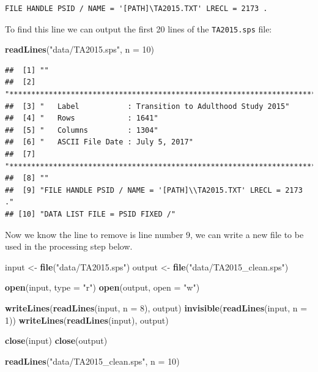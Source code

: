 \documentclass[]{book}
\newenvironment{Shaded}{\begin{snugshade}}{\end{snugshade}}
\newcommand{\KeywordTok}[1]{\textcolor[rgb]{0.13,0.29,0.53}{\textbf{{#1}}}}
\newcommand{\DataTypeTok}[1]{\textcolor[rgb]{0.13,0.29,0.53}{{#1}}}
\newcommand{\DecValTok}[1]{\textcolor[rgb]{0.00,0.00,0.81}{{#1}}}
\newcommand{\StringTok}[1]{\textcolor[rgb]{0.31,0.60,0.02}{{#1}}}
\newcommand{\NormalTok}[1]{{#1}}
\theoremstyle{definition}
\theoremstyle{definition}
\theoremstyle{remark}
\begin{document}
\begin{verbatim}
FILE HANDLE PSID / NAME = '[PATH]\TA2015.TXT' LRECL = 2173 .
\end{verbatim}

To find this line we can output the first 20 lines of the
\texttt{TA2015.sps} file:

\begin{Shaded}
\begin{Highlighting}[]
\KeywordTok{readLines}\NormalTok{(}\StringTok{"data/TA2015.sps"}\NormalTok{, }\DataTypeTok{n =} \DecValTok{10}\NormalTok{)}
\end{Highlighting}
\end{Shaded}

\begin{verbatim}
##  [1] ""                                                                          
##  [2] "**************************************************************************"
##  [3] "   Label           : Transition to Adulthood Study 2015"                   
##  [4] "   Rows            : 1641"                                                 
##  [5] "   Columns         : 1304"                                                 
##  [6] "   ASCII File Date : July 5, 2017"                                         
##  [7] "*************************************************************************."
##  [8] ""                                                                          
##  [9] "FILE HANDLE PSID / NAME = '[PATH]\\TA2015.TXT' LRECL = 2173 ."             
## [10] "DATA LIST FILE = PSID FIXED /"
\end{verbatim}

Now we know the line to remove is line number 9, we can write a new file
to be used in the processing step below.

\begin{Shaded}
\begin{Highlighting}[]
\NormalTok{input <-}\StringTok{ }\KeywordTok{file}\NormalTok{(}\StringTok{"data/TA2015.sps"}\NormalTok{)}
\NormalTok{output <-}\StringTok{ }\KeywordTok{file}\NormalTok{(}\StringTok{"data/TA2015_clean.sps"}\NormalTok{)}

\KeywordTok{open}\NormalTok{(input, }\DataTypeTok{type =} \StringTok{"r"}\NormalTok{)}
\KeywordTok{open}\NormalTok{(output, }\DataTypeTok{open =} \StringTok{"w"}\NormalTok{)}

\KeywordTok{writeLines}\NormalTok{(}\KeywordTok{readLines}\NormalTok{(input, }\DataTypeTok{n =} \DecValTok{8}\NormalTok{), output)}
\KeywordTok{invisible}\NormalTok{(}\KeywordTok{readLines}\NormalTok{(input, }\DataTypeTok{n =} \DecValTok{1}\NormalTok{))}
\KeywordTok{writeLines}\NormalTok{(}\KeywordTok{readLines}\NormalTok{(input), output)}

\KeywordTok{close}\NormalTok{(input)}
\KeywordTok{close}\NormalTok{(output)}

\KeywordTok{readLines}\NormalTok{(}\StringTok{"data/TA2015_clean.sps"}\NormalTok{, }\DataTypeTok{n =} \DecValTok{10}\NormalTok{)}
\end{Highlighting}
\end{Shaded}
\end{document}
